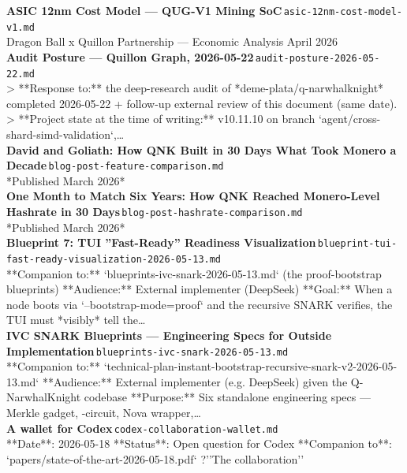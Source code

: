 \documentclass[11pt,a4paper]{article}
\begin{document}
\noindent\textbf{ASIC 12nm Cost Model --- QUG-V1 Mining SoC}\,\textcolor{qgray}{\small \texttt{asic-12nm-cost-model-v1.md}}\\
Dragon Ball x Quillon Partnership --- Economic Analysis April 2026\\[6pt]
\noindent\textbf{Audit Posture --- Quillon Graph, 2026-05-22}\,\textcolor{qgray}{\small \texttt{audit-posture-2026-05-22.md}}\\
\textgreater{} **Response to:** the deep-research audit of *deme-plata/q-narwhalknight* completed 2026-05-22 + follow-up external review of this document (same date). \textgreater{} **Project state at the time of writing:** v10.11.10 on branch `agent/cross-shard-simd-validation`,\ldots{}\\[6pt]
\noindent\textbf{David and Goliath: How QNK Built in 30 Days What Took Monero a Decade}\,\textcolor{qgray}{\small \texttt{blog-post-feature-comparison.md}}\\
*Published March 2026*\\[6pt]
\noindent\textbf{One Month to Match Six Years: How QNK Reached Monero-Level Hashrate in 30 Days}\,\textcolor{qgray}{\small \texttt{blog-post-hashrate-comparison.md}}\\
*Published March 2026*\\[6pt]
\noindent\textbf{Blueprint 7: TUI ''Fast-Ready'' Readiness Visualization}\,\textcolor{qgray}{\small \texttt{blueprint-tui-fast-ready-visualization-2026-05-13.md}}\\
**Companion to:** `blueprints-ivc-snark-2026-05-13.md` (the proof-bootstrap blueprints) **Audience:** External implementer (DeepSeek) **Goal:** When a node boots via `--bootstrap-mode=proof` and the recursive SNARK verifies, the TUI must *visibly* tell the\ldots{}\\[6pt]
\noindent\textbf{IVC SNARK Blueprints --- Engineering Specs for Outside Implementation}\,\textcolor{qgray}{\small \texttt{blueprints-ivc-snark-2026-05-13.md}}\\
**Companion to:** `technical-plan-instant-bootstrap-recursive-snark-v2-2026-05-13.md` **Audience:** External implementer (e.g. DeepSeek) given the Q-NarwhalKnight codebase **Purpose:** Six standalone engineering specs --- Merkle gadget, \textdelta{}-circuit, Nova wrapper,\ldots{}\\[6pt]
\noindent\textbf{A wallet for Codex}\,\textcolor{qgray}{\small \texttt{codex-collaboration-wallet.md}}\\
**Date**: 2026-05-18 **Status**: Open question for Codex **Companion to**: `papers/state-of-the-art-2026-05-18.pdf` ?''The collaboration''\\[6pt]
\end{document}
